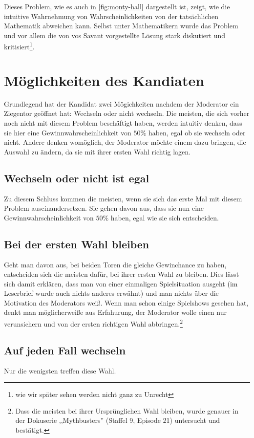 Dieses Problem, wie es auch in \autoref{fig:monty-hall} dargestellt ist, zeigt, wie die intuitive Wahrnehmung von Wahrscheinlichkeiten von der tatsächlichen Mathematik abweichen kann. Selbst unter Mathematikern wurde das Problem und vor allem die von vos Savant vorgestellte Lösung stark diskutiert und kritisiert\footnote{wie wir später sehen werden nicht ganz zu Unrecht}.

\section{Möglichkeiten des Kandiaten}

Grundlegend hat der Kandidat zwei Mögichkeiten nachdem der Moderator ein Ziegentor geöffnet hat: Wechseln oder nicht wechseln. Die meisten, die sich vorher noch nicht mit diesem Problem beschäftigt haben, werden intuitiv denken, dass sie hier eine Gewinnwahrscheinlichkeit von $50\%$ haben, egal ob sie wechseln oder nicht. Andere denken womöglich, der Moderator möchte einem dazu bringen, die Auswahl zu ändern, da sie mit ihrer ersten Wahl richtig lagen.

\subsection{Wechseln oder nicht ist egal}

Zu diesem Schluss kommen die meisten, wenn sie sich das erste Mal mit diesem Problem auseinandersetzen. Sie gehen davon aus, dass sie nun eine Gewinnwahrscheinlichkeit von $50\%$ haben, egal wie sie sich entscheiden.

\subsection{Bei der ersten Wahl bleiben}

Geht man davon aus, bei beiden Toren die gleiche Gewinchance zu haben, entscheiden sich die meisten dafür, bei ihrer ersten Wahl zu bleiben. Dies lässt sich damit erklären, dass man von einer einmaligen Spielsituation ausgeht (im Leserbrief wurde auch nichts anderes erwähnt) und man nichts über die Motivation des Moderators weiß. Wenn man schon einige Spielshows gesehen hat, denkt man möglicherweiße aus Erfahurung, der Moderator wolle einen nur verunsichern und von der ersten richtigen Wahl abbringen.\footnote{Dass die meisten bei ihrer Ursprünglichen Wahl bleiben, wurde genauer in der Dokuserie ,,Mythbusters'' (Staffel 9, Episode 21) untersucht und bestätigt.}

\subsection{Auf jeden Fall wechseln}

Nur die wenigsten treffen diese Wahl.


